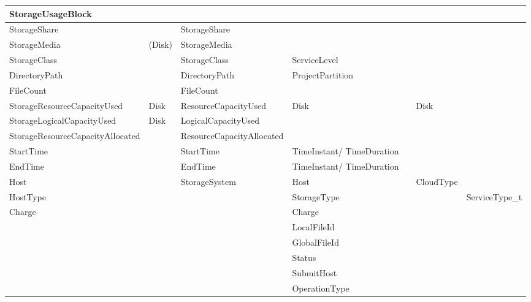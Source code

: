 \begin{longtable}{ | p{} | p{} | p{} | p{} | p{} | p{} | p{} | }



\textbf{Storage\-Usage\-Block}& 		& 			&			& 			& 						& \\ \hline
Storage\-Share		& 			& StorageShare		&			& 			& 						& \\ \hline
Storage\-Media		& (Disk)		& StorageMedia		&			& 			& 						& \\ \hline
Storage\-Class		& 			& StorageClass		& Service\-Level	& 			& 						& \\ \hline
Directory\-Path		& 			& Directory\-Path	& Project\-Partition	& 			& 						& \\ \hline
FileCount		& 			& FileCount		& 			& 			& 						& \\ \hline
Storage\-Resource\-Capacity\-Used& Disk		& Resource\-Capacity\-Used& Disk		&			& Disk						& \\ \hline
Storage\-Logical\-Capacity\-Used& Disk		& Logical\-Capacity\-Used&			& 			& 						& \\ \hline
Storage\-Resource\-Capacity\-Allocated& 	& Resource\-Capacity\-Allocated&		& 			& 						& \\ \hline
Start\-Time		& 			& StartTime		& Time\-Instant/ Time\-Duration& 		& 						& \\ \hline
End\-Time		& 			& EndTime		& Time\-Instant/ Time\-Duration& 		& 						& \\ \hline
Host			& 			& Storage\-System	& Host			& 			& CloudType					& \\ \hline
HostType		& 			& 			& Storage\-Type		& 			& 						& ServiceType\_t\\ \hline
Charge			& 			& 			& Charge		& 			& 						& \\ \hline
			& 			& 			& Local\-File\-Id	& 			& 					& \\ \hline
			& 			& 			& Global\-File\-Id	& 			& 					& \\ \hline
			& 			& 			& Status		& 			& 					& \\ \hline
			& 			& 			& Submit\-Host		& 			& 					& \\ \hline
			& 			& 			& Operation\-Type	& 			& 					& \\ \hline\hline






\end{longtable}
